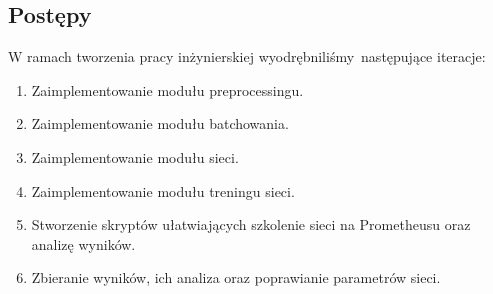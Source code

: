 \subsection{Postępy}
W ramach tworzenia pracy inżynierskiej wyodrębniliśmy następujące iteracje:
\begin{enumerate}
  \item Zaimplementowanie modułu preprocessingu.
  \item Zaimplementowanie modułu batchowania.
  \item Zaimplementowanie modułu sieci.
  \item Zaimplementowanie modułu treningu sieci.
  \item Stworzenie skryptów ułatwiających szkolenie sieci na Prometheusu oraz analizę wyników.
  \item Zbieranie wyników, ich analiza oraz poprawianie parametrów sieci.
\end{enumerate}

